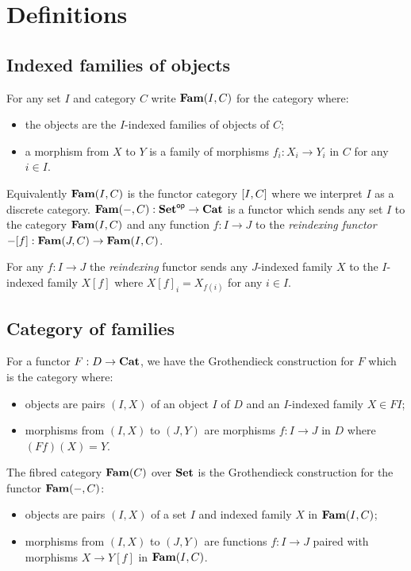 \section{Definitions}

\subsection{Indexed families of objects}

For any set $I$ and category $C$ write $\mathbf{Fam}(I,C)$ for the category where:
\begin{itemize}
\item the objects are the $I$-indexed families of objects of $C$;
\item a morphism from $X$ to $Y$ is a family of morphisms $f_i: X_i \to Y_i$ in $C$ for any $i \in I$.
\end{itemize}

\noindent Equivalently $\mathbf{Fam}(I,C)$ is the functor category $[I,C]$ where we interpret $I$ as a discrete
category. $\mathbf{Fam}(-,C): \mathbf{Set}^{\mathsf{op}} \to \mathbf{Cat}$ is a functor which sends any set $I$ to the category $\mathbf{Fam}(I,C)$
and any function $f: I \to J$ to the \emph{reindexing functor} $-[f]: \mathbf{Fam}(J,C) \to \mathbf{Fam}(I,C)$.

\begin{definition}[Reindexing]
For any $f: I \to J$ the \emph{reindexing} functor sends any $J$-indexed family $X$ to the $I$-indexed family
$X[f]$ where $X[f]_i = X_{f(i)}$ for any $i \in I$.
\end{definition}

\subsection{Category of families}

For a functor $F: D \to \mathbf{Cat}$, we have the Grothendieck construction for $F$ which is the category where:
\begin{itemize}
\item objects are pairs $(I, X)$ of an object $I$ of $D$ and an $I$-indexed family $X \in FI$;
\item morphisms from $(I, X)$ to $(J, Y)$ are morphisms $f: I \to J$ in $D$ where $(Ff)(X) = Y$.
\end{itemize}

\noindent The fibred category $\mathbf{Fam}(C)$ over $\mathbf{Set}$ is the Grothendieck construction for the functor
$\mathbf{Fam}(-,C)$:
\begin{itemize}
\item objects are pairs $(I, X)$ of a set $I$ and indexed family $X$ in $\mathbf{Fam}(I,C)$;
\item morphisms from $(I, X)$ to $(J, Y)$ are functions $f: I \to J$ paired with morphisms $X \to Y[f]$ in
$\mathbf{Fam}(I,C)$.
\end{itemize}


